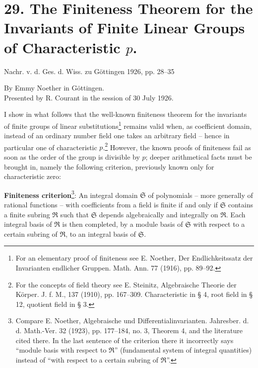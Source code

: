 \documentclass[11pt]{article}
\begin{document}
\section*{29. The Finiteness Theorem for the Invariants of Finite Linear Groups of Characteristic $p$.}

\begin{center}
Nachr. v. d. Ges. d. Wiss. zu Göttingen 1926, pp. 28--35
\end{center}

\setcounter{footnote}{0}

\begin{center}
By Emmy Noether in Göttingen.\\[0.5em]
Presented by R. Courant in the session of 30 July 1926.
\end{center}

I show in what follows that the well-known finiteness theorem for the invariants of finite groups of linear substitutions\footnote{For an elementary proof of finiteness see E. Noether, Der Endlichkeitssatz der Invarianten endlicher Gruppen. Math. Ann. 77 (1916), pp. 89--92.} remains valid when, as coefficient domain, instead of an ordinary number field one takes an arbitrary field -- hence in particular one of characteristic $p$.\footnote{For the concepts of field theory see E. Steinitz, Algebraische Theorie der Körper. J. f. M., 137 (1910), pp. 167--309. Characteristic in § 4, root field in § 12, quotient field in § 3.} However, the known proofs of finiteness fail as soon as the order of the group is divisible by $p$; deeper arithmetical facts must be brought in, namely the following criterion, previously known only for characteristic zero:

\textbf{Finiteness criterion}\footnote{Compare E. Noether, Algebraische und Differentialinvarianten. Jahresber. d. d. Math.-Ver. 32 (1923), pp. 177--184, no. 3, Theorem 4, and the literature cited there. In the last sentence of the criterion there it incorrectly says ``module basis with respect to $\mathfrak R$'' (fundamental system of integral quantities) instead of ``with respect to a certain subring of $\mathfrak R$''.}: An integral domain $\mathfrak S$ of polynomials -- more generally of rational functions -- with coefficients from a field is finite if and only if $\mathfrak S$ contains a finite subring $\mathfrak R$ such that $\mathfrak S$ depends algebraically and integrally on $\mathfrak R$. Each integral basis of $\mathfrak R$ is then completed, by a module basis of $\mathfrak S$ with respect to a certain subring of $\mathfrak R$, to an integral basis of $\mathfrak S$.
\end{document}
